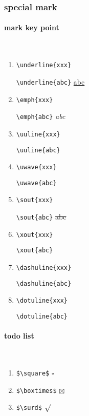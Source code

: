 
\subsubsection{special mark}

\paragraph{mark key point}~{}

\begin{enumerate}[topsep=0pt,itemsep=0pt,parsep=0pt,leftmargin=3.6em,label=\arabic*>]
    \item \verb!\underline{xxx}! \par
        \verb!\underline{abc}!  \underline{abc}
    \item \verb!\emph{xxx}! \par
        \verb!\emph{abc}!  \emph{abc}
    \item \verb!\uuline{xxx}! \par
        \verb!\uuline{abc}!  
    \item \verb!\uwave{xxx}! \par
        \verb!\uwave{abc}!  
    \item \verb!\sout{xxx}! \par
        \verb!\sout{abc}!  \sout{abc}
    \item \verb!\xout{xxx}! \par
        \verb!\xout{abc}!  
    \item \verb!\dashuline{xxx}! \par
        \verb!\dashuline{abc}!  
    \item \verb!\dotuline{xxx}! \par
        \verb!\dotuline{abc}!  
\end{enumerate}

\paragraph{todo list}~{}

\begin{enumerate}[topsep=0pt,itemsep=0pt,parsep=0pt,leftmargin=3.6em,label=\arabic*>]
    \item \verb!$\square$!  $\square$
    \item \verb!$\boxtimes$!  $\boxtimes$
    \item \verb!$\surd$!  $\surd$
\end{enumerate}

